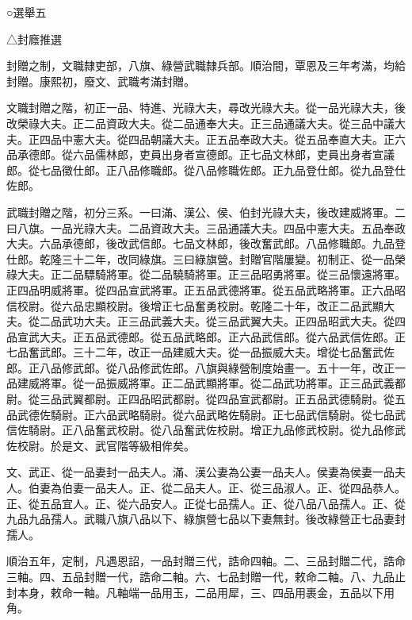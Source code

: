 
\begin{pinyinscope}
○選舉五

△封廕推選

封贈之制，文職隸吏部，八旗、綠營武職隸兵部。順治間，覃恩及三年考滿，均給封贈。康熙初，廢文、武職考滿封贈。

文職封贈之階，初正一品、特進、光祿大夫，尋改光祿大夫。從一品光祿大夫，後改榮祿大夫。正二品資政大夫。從二品通奉大夫。正三品通議大夫。從三品中議大夫。正四品中憲大夫。從四品朝議大夫。正五品奉政大夫。從五品奉直大夫。正六品承德郎。從六品儒林郎，吏員出身者宣德郎。正七品文林郎，吏員出身者宣議郎。從七品徵仕郎。正八品修職郎。從八品修職佐郎。正九品登仕郎。從九品登仕佐郎。

武職封贈之階，初分三系。一曰滿、漢公、侯、伯封光祿大夫，後改建威將軍。二曰八旗。一品光祿大夫。二品資政大夫。三品通議大夫。四品中憲大夫。五品奉政大夫。六品承德郎，後改武信郎。七品文林郎，後改奮武郎。八品修職郎。九品登仕郎。乾隆三十二年，改同綠旗。三曰綠旗營。封贈官階屢變。初制正、從一品榮祿大夫。正二品驃騎將軍。從二品驍騎將軍。正三品昭勇將軍。從三品懷遠將軍。正四品明威將軍。從四品宣武將軍。正五品武德將軍。從五品武略將軍。正六品昭信校尉。從六品忠顯校尉。後增正七品奮勇校尉。乾隆二十年，改正二品武顯大夫。從二品武功大夫。正三品武義大夫。從三品武翼大夫。正四品昭武大夫。從四品宣武大夫。正五品武德郎。從五品武略郎。正六品武信郎。從六品武信佐郎。正七品奮武郎。三十二年，改正一品建威大夫。從一品振威大夫。增從七品奮武佐郎。正八品修武郎。從八品修武佐郎。八旗與綠營制度始畫一。五十一年，改正一品建威將軍。從一品振威將軍。正二品武顯將軍。從二品武功將軍。正三品武義都尉。從三品武翼都尉。正四品昭武都尉。從四品宣武都尉。正五品武德騎尉。從五品武德佐騎尉。正六品武略騎尉。從六品武略佐騎尉。正七品武信騎尉。從七品武信佐騎尉。正八品奮武校尉。從八品奮武佐校尉。增正九品修武校尉。從九品修武佐校尉。於是文、武官階等級相侔矣。

文、武正、從一品妻封一品夫人。滿、漢公妻為公妻一品夫人。侯妻為侯妻一品夫人。伯妻為伯妻一品夫人。正、從二品夫人。正、從三品淑人。正、從四品恭人。正、從五品宜人。正、從六品安人。正從七品孺人。正、從八品八品孺人。正、從九品九品孺人。武職八旗八品以下、綠旗營七品以下妻無封。後改綠營正七品妻封孺人。

順治五年，定制，凡遇恩詔，一品封贈三代，誥命四軸。二、三品封贈二代，誥命三軸。四、五品封贈一代，誥命二軸。六、七品封贈一代，敕命二軸。八、九品止封本身，敕命一軸。凡軸端一品用玉，二品用犀，三、四品用裹金，五品以下用角。


\end{pinyinscope}
